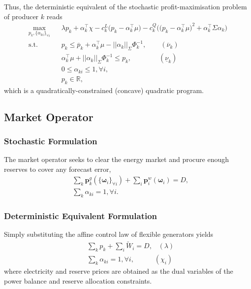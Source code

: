 \documentclass{article}
\begin{document}
Thus, the deterministic equivalent of the stochastic profit-maximisation problem of producer $k$ reads
\begin{align}
\underset{p_k, \{\alpha_{ki}\}_{\forall i}}{\max} \hspace{10pt} & \lambda p_k + \alpha_k^\top \chi - c_k^L\big(p_k - \alpha_k^\top \mu\big) - c_k^Q \Big(\big(p_k - \alpha_{k}^\top \mu \big)^2 + \alpha_k^\top \Sigma \alpha_k\Big)\\
\mbox{s.t. } & p_k \le \overline{p}_k + \alpha_k^\top \mu - ||\alpha_k||_{\Sigma} \Phi_k^{-1}, \hspace{25pt} (\overline{\nu}_k)\\
& \alpha_k^\top \mu + ||\alpha_k||_{\Sigma} \Phi_k^{-1} \le p_k, \hspace{48pt}(\underline{\nu}_k)\\
& 0 \le \alpha_{ki} \le 1, \forall i,\\
&p_k \in \mathbb{R},
\end{align}
which is a quadratically-constrained (concave) quadratic program.
\subsection{Market Operator}

\subsubsection{Stochastic Formulation}

The market operator seeks to clear the energy market and procure enough reserves to cover any forecast error,
\begin{align}
& \sum_k \mathbf{p}_k^g(\{\boldsymbol{\omega}_i\}_{\forall i}) + \sum_i \mathbf{p}_i^w(\boldsymbol{\omega}_i) = D,\\
& \sum_{k} \alpha_{ki} = 1, \forall i.
\end{align}

\subsubsection{Deterministic Equivalent Formulation}

Simply substituting the affine control law of flexible generators yields
\begin{align}
& \sum_k p_k + \sum_i \tilde{W}_i = D, \hspace{10pt} (\lambda)\\
& \sum_k \alpha_{ki} = 1, \forall i, \hspace{35pt} (\chi_i)
\end{align}
where electricity and reserve prices are obtained as the dual variables of the power balance and reserve allocation constraints.
\end{document}
